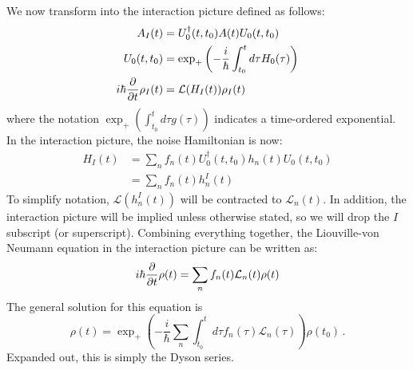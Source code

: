 We now transform into the interaction picture defined as follows:
\begin{align}
    A_I(t)                   & = U_0^\dag(t,t_0)A(t)U_0(t,t_0)                                    \\
    U_0(t,t_0)               & = \exp_+\left(-\frac{i}{\hbar}\int_{t_0}^{t}d\tau H_0(\tau)\right) \\
    i\hbar\frac{\partial}{\partial t}\rho_I(t) & = \mathcal{L}(H_I(t))\rho_I(t)
\end{align}
where the notation $\exp_+\left(\int_{t_0}^{t}d\tau g(\tau)\right)$ indicates a time-ordered exponential.
In the interaction picture, the noise Hamiltonian is now:
\begin{align}
    H_I(t) & = \sum_n f_n(t)U_0^\dag(t,t_0)h_n(t)U_0(t,t_0) \nonumber \\
           & = \sum_n f_n(t)h_n^I(t)
\end{align}
To simplify notation, $\mathcal{L}(h_n^I(t))$ will be contracted to $\mathcal{L}_n(t)$. In addition, the interaction picture will be implied unless otherwise stated, so we will drop the $I$ subscript (or superscript). Combining everything together, the Liouville-von Neumann equation in the interaction picture can be written as:
\begin{equation}
    i\hbar\frac{\partial}{\partial t}\rho(t) = \sum_nf_n(t)\mathcal{L}_n(t)\rho(t)
\end{equation}
The general solution for this equation is
\begin{equation}
    \rho(t)=\exp_+\left(-\frac{i}{\hbar}\sum_n\int_{t_0}^td\tau f_n(\tau)\mathcal{L}_n(\tau)\right)\rho(t_0) \,.
\end{equation}
Expanded out, this is simply the Dyson series.

